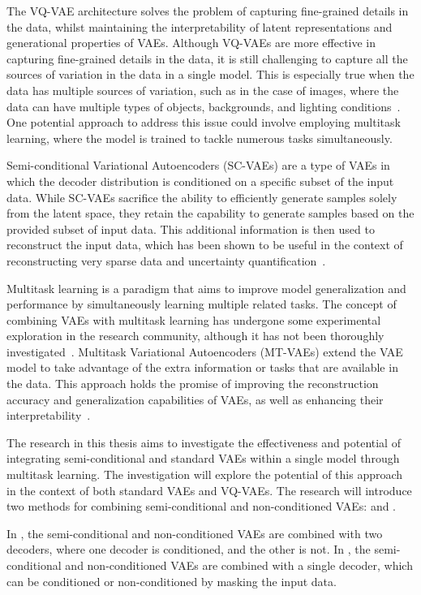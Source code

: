 The VQ-VAE architecture solves the problem of capturing fine-grained details in the data, whilst maintaining the interpretability of latent representations and generational properties of VAEs. 
Although VQ-VAEs are more effective in capturing fine-grained details in the data, it is still challenging to capture all the sources of variation in the data in a single model. This is especially true when the data has multiple sources of variation, such as in the case of images, where the data can have multiple types of objects, backgrounds, and lighting conditions~\cite{Kingma_2019,vqvae, vqvae2}. One potential approach to address this issue could involve employing multitask learning, where the model is trained to tackle numerous tasks simultaneously.

Semi-conditional Variational Autoencoders (SC-VAEs) are a type of VAEs in which the decoder distribution is conditioned on a specific subset of the input data. While SC-VAEs sacrifice the ability to efficiently generate samples solely from the latent space, they retain the capability to generate samples based on the provided subset of input data. This additional information is then used to reconstruct the input data, which has been shown to be useful in the context of reconstructing very sparse data and uncertainty quantification~\cite{Gundersen_2021}.

Multitask learning is a paradigm that aims to improve model generalization and performance by simultaneously learning multiple related tasks. The concept of combining VAEs with multitask learning has undergone some experimental exploration in the research community, although it has not been thoroughly investigated~\cite{multitaskvib}. Multitask Variational Autoencoders (MT-VAEs) extend the VAE model to take advantage of the extra information or tasks that are available in the data. This approach holds the promise of improving the reconstruction accuracy and generalization capabilities of VAEs, as well as enhancing their interpretability~\cite{multitasklearning}.

The research in this thesis aims to investigate the effectiveness and potential of integrating semi-conditional and standard VAEs within a single model through multitask learning. The investigation will explore the potential of this approach in the context of both standard VAEs and VQ-VAEs. The research will introduce two methods for combining semi-conditional and non-conditioned VAEs: and .

In , the semi-conditional and non-conditioned VAEs are combined with two decoders, where one decoder is conditioned, and the other is not. In , the semi-conditional and non-conditioned VAEs are combined with a single decoder, which can be conditioned or non-conditioned by masking the input data.

